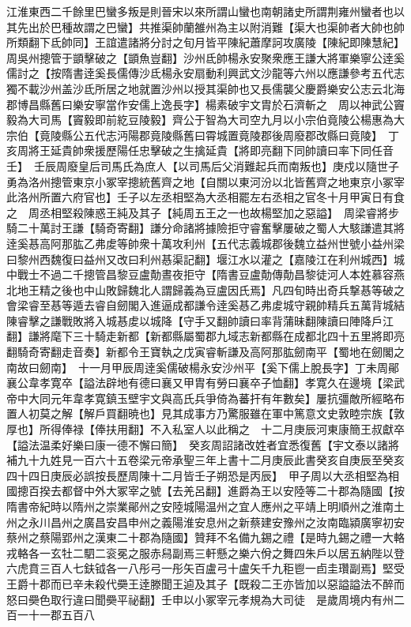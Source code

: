 江淮東西二千餘里巴蠻多叛是則晉宋以來所謂山蠻也南朝諸史所謂荆雍州蠻者也以其先出於巴種故謂之巴蠻】共推渠帥蘭雒州為主以附消難【渠大也渠帥者大帥也帥所類翻下氐帥同】王誼遣諸將分討之旬月皆平陳紀蕭摩訶攻廣陵【陳紀即陳慧紀】周吳州摠管于顗擊破之【顗魚豈翻】沙州氐帥楊永安聚衆應王謙大將軍樂寧公逹奚儒討之【按隋書逹奚長儒傳沙氐楊永安扇動利興武文沙龍等六州以應謙參考五代志獨不載沙州盖沙氐所居之地就置沙州以授其渠帥也又長儒襲父慶爵樂安公志云北海郡博昌縣舊曰樂安寧當作安儒上逸長字】楊素破宇文胄於石濟斬之　周以神武公竇毅為大司馬【竇毅即前紇豆陵毅】齊公于智為大司空九月以小宗伯竟陵公楊惠為大宗伯【竟陵縣公五代志沔陽郡竟陵縣舊曰霄城置竟陵郡後周廢郡改縣曰竟陵】　丁亥周將王延貴帥衆援歷陽任忠擊破之生擒延貴【將即亮翻下同帥讀曰率下同任音壬】　壬辰周廢皇后司馬氏為庶人【以司馬后父消難起兵而南叛也】庚戍以隨世子勇為洛州摠管東京小冢宰摠統舊齊之地【自關以東河汾以北皆舊齊之地東京小冢宰此洛州所置六府官也】壬子以左丞相堅為大丞相罷左右丞相之官冬十月甲寅日有食之　周丞相堅殺陳惑王純及其子【純周五王之一也故楊堅加之惡謚】　周梁睿將步騎二十萬討王謙【騎奇寄翻】謙分命諸將據險拒守睿奮擊屢破之蜀人大駭謙遣其將逹奚惎高阿那肱乙弗䖍等帥衆十萬攻利州【五代志義城郡後魏立益州世號小益州梁曰黎州西魏復曰益州又改曰利州惎渠記翻】堰江水以灌之【嘉陵江在利州城西】城中戰士不過二千摠管昌黎豆盧勣晝夜拒守【隋書豆盧勣傳勣昌黎徒河人本姓慕容燕北地王精之後也中山敗歸魏北人謂歸義為豆盧因氏焉】凡四旬時出奇兵撃惎等破之會梁睿至惎等遁去睿自劒閣入進逼成都謙令逹奚惎乙弗䖍城守親帥精兵五萬背城結陳睿擊之謙戰敗將入城惎䖍以城降【守手又翻帥讀曰率背蒲昧翻陳讀曰陣降戶江翻】謙將麾下三十騎走新都【新都縣屬蜀郡九域志新都縣在成都北四十五里將即亮翻騎奇寄翻走音奏】新都令王寶執之戊寅睿斬謙及高阿那肱劒南平【蜀地在劒閣之南故曰劒南】　十一月甲辰周逹奚儒破楊永安沙州平【奚下儒上脫長字】丁未周鄖襄公韋孝寛卒【謚法辟地有德曰襄又甲胄有勞曰襄卒子恤翻】孝寛久在邊境【梁武帝中大同元年韋孝寛鎮玉壁宇文與高氏兵爭倚為蕃扞有年數矣】屢抗彊敵所經略布置人初莫之解【解戶買翻暁也】見其成事方乃驚服雖在軍中篤意文史敦睦宗族【敦厚也】所得俸禄【俸扶用翻】不入私室人以此稱之　十二月庚辰河東康簡王叔獻卒【謚法温柔好樂曰康一德不懈曰簡】　癸亥周詔諸改姓者宜悉復舊【宇文泰以諸將補九十九姓見一百六十五卷梁元帝承聖三年上書十二月庚辰此書癸亥自庚辰至癸亥四十四日庚辰必誤按長歷周陳十二月皆壬子朔恐是丙辰】　甲子周以大丞相堅為相國摠百揆去都督中外大冢宰之號【去羌呂翻】進爵為王以安陸等二十郡為隨國【按隋書帝紀時以隋州之崇業鄖州之安陸城陽温州之宜人應州之平靖上明順州之淮南土州之永川昌州之廣昌安昌申州之義陽淮安息州之新蔡建安豫州之汝南臨潁廣寧初安蔡州之蔡陽郢州之漢東二十郡為隨國】贊拜不名備九錫之禮【是時九錫之禮一大輅戎輅各一玄牡二駟二衮冕之服赤舄副焉三軒懸之樂六佾之舞四朱戶以居五納陛以登六虎賁三百人七鈇钺各一八彤弓一彤矢百盧弓十盧矢千九秬鬯一卣圭瓚副焉】堅受王爵十郡而已辛未殺代奰王逹滕聞王逌及其子【既殺二王亦皆加以惡謚謚法不醉而怒曰奰色取行違曰聞奰平祕翻】壬申以小冢宰元孝規為大司徒　是歲周境内有州二百一十一郡五百八

